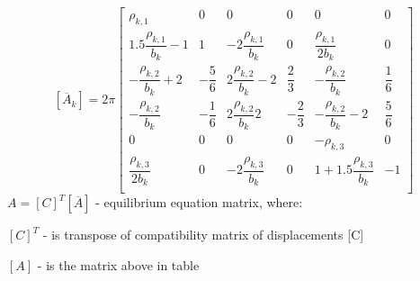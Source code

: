   \begin{equation}\label{eqn:eqMatrix}
    [\overline{A}_k]=2\pi
    \begin{bmatrix}
        \rho_{k,1} & 0 & 0 & 0 & 0 & 0 \\[2ex]
        1.5\dfrac{\rho_{k,1}}{b_k}-1 & 1 & -2\dfrac{\rho_{k,1}}{b_k} & 0 & \dfrac{\rho_{k,1}}{2b_k} & 0 \\[2ex]
        -\dfrac{\rho_{k,2}}{b_k}+2 & -\dfrac{5}{6} & 2\dfrac{\rho_{k,2}}{b_k}-2 & \dfrac{2}{3} & -\dfrac{\rho_{k,2}}{b_k} & \dfrac{1}{6} \\[2ex]
        -\dfrac{\rho_{k,2}}{b_k} & -\dfrac{1}{6} & 2\dfrac{\rho_{k,2}}{b_k}2 & -\dfrac{2}{3} & -\dfrac{\rho_{k,2}}{b_k}-2 & \dfrac{5}{6} \\[2ex]
        0 & 0 & 0 & 0 & -\rho_{k,3} & 0 \\[2ex]
        \dfrac{\rho_{k,3}}{2b_k} & 0 & -2\dfrac{\rho_{k,3}}{b_k} & 0 & 1+1.5\dfrac{\rho_{k,3}}{b_k} & -1 \\[2ex]
      \end{bmatrix}
  \end{equation}
$A=[C]^T[\overline{A}]$ - equilibrium equation matrix, where:\par
$[C]^T$ - is transpose of compatibility matrix of displacements [C]\par
$[A]$ - is the matrix above in table\par
\begin{multicols}{2}
\end{multicols}